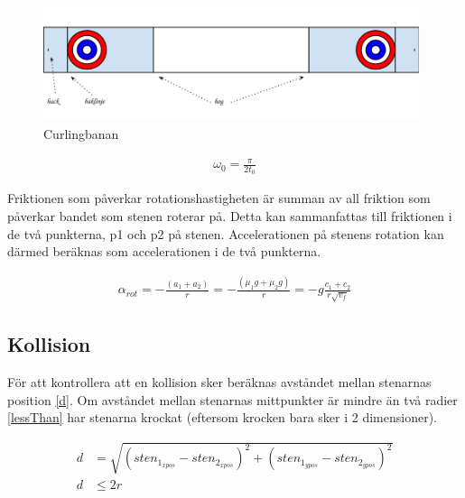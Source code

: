 \documentclass[11pt]{article} %
\begin{document}
\begin{figure}[ht!]
\centering
\includegraphics[width=110mm]{bana.png}
\caption{Curlingbanan}
\label{fig:bana}
\label{overflow}
\end{figure}


\begin{align}%
 \omega_0 = \frac{\pi}{2 t_0} 
 \end{align}


Friktionen som påverkar rotationshastigheten är summan av all friktion som påverkar bandet som stenen roterar på. Detta kan sammanfattas till friktionen i de två punkterna, p1 och p2 på stenen. Accelerationen på stenens rotation kan därmed beräknas som accelerationen i de två punkterna. 

 \begin{align}\label{a_rotation1}
 \alpha_{rot} =- \frac{( a_1 + a_2)}{r} = -\frac{(\mu_1 g + \mu_2 g)}{r} = - g\frac{c_1+c_2}{r \sqrt{v_f}}
 \end{align}
 

\subsection{Kollision}

För att kontrollera att en kollision sker beräknas avståndet mellan stenarnas position \eqref{d}.
Om avståndet mellan stenarnas mittpunkter är mindre än två radier \eqref{lessThan} har stenarna krockat  (eftersom krocken bara sker i 2 dimensioner). 

 \begin{subequations}\label{d}
 \begin{align}
 d& = \sqrt{(sten_{1_{xpos}} - sten_{2_{xpos}})^2   +   (sten_{1_{ypos}}-sten_{2_{ypos}})^2}\\\label{lessThan}
 d& \le 2 r
 \end{align}
 \end{subequations}
\end{document}
